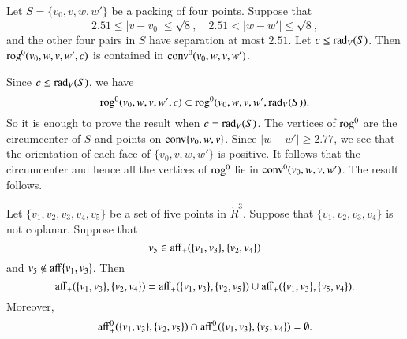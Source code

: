 \begin{tarskidata}
\begin{tarski}
\begin{lemma}
Let $S=\{v_0,v,w,w'\}$ be a packing of four points.
Suppose that
   $$
   2.51\le |v-v_0|\le\sqrt8,\quad 2.51< |w-w'|\le\sqrt8,
   $$
and the other four pairs in $S$ have separation at most $2.51$.
Let $c\le \operatorname{rad}_V(S)$.
Then ${\operatorname{rog}}^0(v_0,w,v,w',c)$ is contained in
${\operatorname{conv}}^0(v_0,w,v,w')$.
\end{lemma}

\begin{proved}  Since $c\le \operatorname{rad}_V(S)$, we have
  $$
  {\operatorname{rog}}^0(v_0,w,v,w',c)\subset {\operatorname{rog}}^0(v_0,w,v,w',\operatorname{rad}_V(S)).
  $$
So it is enough to prove the result when $c=\operatorname{rad}_V(S)$.
The vertices of ${\operatorname{rog}}^0$ are the circumcenter of $S$ and points
on ${\operatorname{conv}}\{v_0,w,v\}$.
Since $|w-w'|\ge 2.77$, we see that the orientation of each face
of $\{v_0,v,w,w'\}$ is positive.   It follows that the circumcenter
and hence all
the vertices of ${\operatorname{rog}}^0$ lie in ${\operatorname{conv}}^0(v_0,w,v,w')$.
The result follows.
\swallowed\end{proved}
\end{tarski}





\begin{tarski}

\begin{lemma}
Let $\{v_1,v_2,v_3,v_4,v_5\}$ be a set of five
points in $\ring{R}^3$.  Suppose that $\{v_1,v_2,v_3,v_4\}$ is
not coplanar.  Suppose that 
    $$v_5\in {\operatorname{aff}}_+(\{v_1,v_3\},\{v_2,v_4\})$$
and $v_5\not\in{\operatorname{aff}}\{v_1,v_3\}$.
Then 
    $$
    {\operatorname{aff}}_+(\{v_1,v_3\},\{v_2,v_4\}) = 
{\operatorname{aff}}_+(\{v_1,v_3\},\{v_2,v_5\}) \cup
{\operatorname{aff}}_+(\{v_1,v_3\},\{v_5,v_4\}).
    $$
Moreover,
   $$
{\operatorname{aff}}^0_+(\{v_1,v_3\},\{v_2,v_5\}) \cap
{\operatorname{aff}}^0_+(\{v_1,v_3\},\{v_5,v_4\}) =\emptyset .
   $$
\end{lemma}


\end{tarski}
\end{tarskidata}
